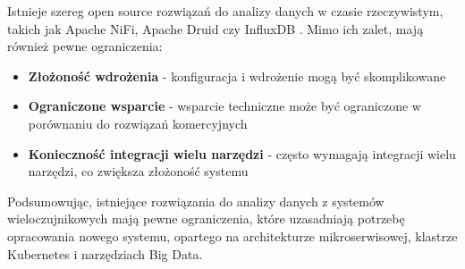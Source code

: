Istnieje szereg open source rozwiązań do analizy danych w czasie rzeczywistym, takich jak Apache NiFi,
Apache Druid czy InfluxDB . Mimo ich zalet, mają również pewne ograniczenia:

\begin{itemize}
    \item \textbf{Złożoność wdrożenia} - konfiguracja i wdrożenie mogą być skomplikowane
    \item \textbf{Ograniczone wsparcie} - wsparcie techniczne może być ograniczone w porównaniu do rozwiązań komercyjnych
    \item \textbf{Konieczność integracji wielu narzędzi} - często wymagają integracji wielu narzędzi, co zwiększa złożoność systemu
\end{itemize}

Podsumowując, istniejące rozwiązania do analizy danych z systemów wieloczujnikowych mają pewne ograniczenia,
które uzasadniają potrzebę opracowania nowego systemu, opartego na architekturze mikroserwisowej, klastrze Kubernetes i narzędziach Big Data.